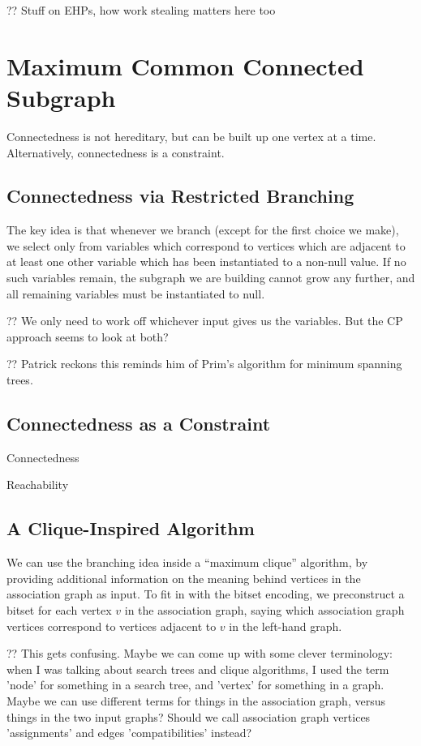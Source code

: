 \documentclass{llncs}
\begin{document}
?? Stuff on EHPs, how work stealing matters here too

\section{Maximum Common Connected Subgraph}

Connectedness is not hereditary, but can be built up one vertex at a time. Alternatively,
connectedness is a constraint.

\subsection{Connectedness via Restricted Branching}

The key idea is that whenever we branch (except for the first choice we make), we select only from
variables which correspond to vertices which are adjacent to at least one other variable which has
been instantiated to a non-null value. If no such variables remain, the subgraph we are building
cannot grow any further, and all remaining variables must be instantiated to null.

?? We only need to work off whichever input gives us the variables. But the CP approach seems to
look at both?

?? Patrick reckons this reminds him of Prim's algorithm for minimum spanning trees.

\subsection{Connectedness as a Constraint}

Connectedness \cite{Brown:2005}

Reachability \cite{DBLP:conf/cp/DoomsDD05,DBLP:conf/cp/QuesadaRD05}

\subsection{A Clique-Inspired Algorithm}

We can use the branching idea inside a ``maximum clique'' algorithm, by providing additional
information on the meaning behind vertices in the association graph as input. To fit in with the
bitset encoding, we preconstruct a bitset for each vertex $v$ in the association graph, saying which
association graph vertices correspond to vertices adjacent to $v$ in the left-hand graph.

?? This gets confusing. Maybe we can come up with some clever terminology: when I was talking about
search trees and clique algorithms, I used the term 'node' for something in a search tree, and
'vertex' for something in a graph. Maybe we can use different terms for things in the association
graph, versus things in the two input graphs? Should we call association graph vertices
'assignments' and edges 'compatibilities' instead?
\end{document}
